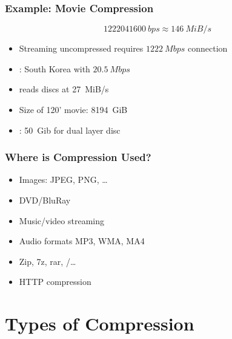 \documentclass{../ucll-slides}
\begin{document}
\begin{frame}
  \frametitle{Example: Movie Compression}
  \[
    \SI{1222041600}{bps} \approx \SI{146}{MiB/s}
  \]
  \vskip5mm
  \begin{itemize}
  \item Streaming uncompressed requires $\SI{1222}{Mbps}$ connection
    \item {}: South Korea with $\SI{20.5}{Mbps}$
  \end{itemize}
  \vskip5mm
  \begin{itemize}
    \item {} reads discs at \SI{27}{MiB/s}
    \item Size of 120' movie: \SI{8194}{GiB}
    \item {}: \SI{50}{Gib} for dual layer disc
  \end{itemize}
\end{frame}

\begin{frame}
  \frametitle{Where is Compression Used?}
  \begin{itemize}
    \item Images: JPEG, PNG, \dots
    \item DVD/BluRay
    \item Music/video streaming
    \item Audio formats MP3, WMA, MA4
    \item Zip, 7z, rar, /\dots
    \item HTTP compression
  \end{itemize}
\end{frame}

\section{Types of Compression}

\frame{\tableofcontents[currentsection]}
\end{document}
